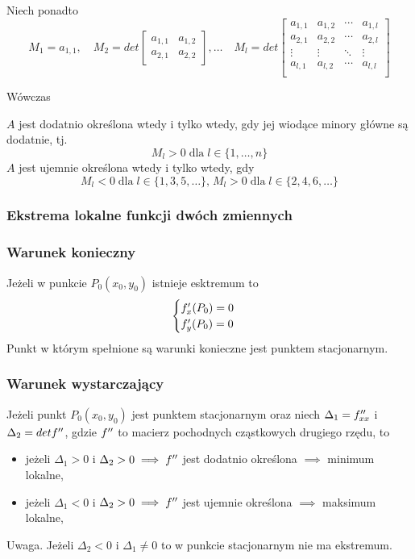 \documentclass[../Matematyka.tex]{subfiles}
\begin{document}
    Niech ponadto
    \begin{displaymath}
        M_1 = a_{1,1}, \quad 
        M_2 = det
        \begin{bmatrix}
            a_{1,1} & a_{1,2} \\
            a_{2,1} & a_{2,2}
        \end{bmatrix}, \dots \quad
        M_l = det
        \begin{bmatrix}
            a_{1,1} & a_{1,2} & \cdots & a_{1,l} \\
            a_{2,1} & a_{2,2} & \cdots & a_{2,l} \\
            \vdots & \vdots & \ddots & \vdots \\
            a_{l,1} & a_{l,2} & \cdots & a_{l,l} \\
        \end{bmatrix}
    \end{displaymath}

    Wówczas\par
    \(A\) jest dodatnio określona wtedy i tylko wtedy, gdy jej wiodące minory główne są dodatnie, tj.
    \[M_l > 0\;\text{dla}\;l \in \{1,\dots,n\}\]
    \(A\) jest ujemnie określona wtedy i tylko wtedy, gdy 
    \[M_l < 0\;\text{dla}\;l \in \{1, 3, 5, \dots\}\text{,}\; M_l > 0\;\text{dla}\;l \in \{2, 4, 6, \dots\}\]

    \subsubsection{Ekstrema lokalne funkcji dwóch zmiennych}
    \subsubsection*{Warunek konieczny}
    Jeżeli w punkcie \(P_0(x_0, y_0)\) istnieje esktremum to 
    \begin{displaymath}
        \begin{cases}
            f^\prime_x(P_0) = 0 \\
            f^\prime_y(P_0) = 0
        \end{cases}
    \end{displaymath}
    Punkt w którym spełnione są warunki konieczne jest punktem stacjonarnym.

    \subsubsection*{Warunek wystarczający}
    Jeżeli punkt \(P_0(x_0, y_0)\) jest punktem stacjonarnym oraz niech \(\Delta_1=f^{\prime\prime}_{xx}\) i \(\Delta_2=detf^{\prime\prime}\), gdzie \(f^{\prime\prime}\) to macierz pochodnych cząstkowych drugiego rzędu, to
    \begin{itemize}
        \item jeżeli \(\Delta_1 > 0\) i \(\Delta_2 > 0 \implies f^{\prime\prime}\) jest dodatnio określona \(\implies\) minimum lokalne,
        \item jeżeli \(\Delta_1 < 0\) i \(\Delta_2 > 0 \implies f^{\prime\prime}\) jest ujemnie określona \(\implies\) maksimum lokalne,
    \end{itemize}

    Uwaga. Jeżeli \(\Delta_2 < 0\) i \(\Delta_1 \neq 0\) to w punkcie stacjonarnym nie ma ekstremum.
\end{document}
